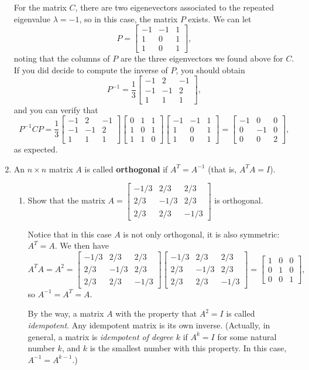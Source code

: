 \documentclass[12pt]{article}
\newcommand{\bbm}{\begin{bmatrix}}
\newcommand{\ebm}{\end{bmatrix}}
\begin{document}
\begin{enumerate}
For the matrix $C$, there are two eigenevectors associated to the repeated eigenvalue $\lambda = -1$, so in this case, the matrix $P$ exists. We can let
\[
 P = \bbm -1&-1&1\\1&0&1\\1&0&1\ebm,
\]
noting that the columns of $P$ are the three eigenvectors we found above for $C$. If you did decide to compute the inverse of $P$, you should obtain
\[
 P^{-1} = \frac{1}{3}\bbm -1&2&-1\\-1&-1&2\\1&1&1\ebm,
\]
and you can verify that
\[
 P^{-1}CP = \frac{1}{3}\bbm -1&2&-1\\-1&-1&2\\1&1&1\ebm\bbm 0&1&1\\1&0&1\\1&1&0\ebm\bbm -1&-1&1\\1&0&1\\1&0&1\ebm = \bbm -1&0&0\\0&-1&0\\0&0&2\ebm,
\]
as expected.

\item An $n\times n$ matrix $A$ is called \textbf{orthogonal} if $A^T=A^{-1}$ (that is, $A^TA=I$).
\begin{enumerate}
 \item Show that the matrix $A=\bbm -1/3&2/3&2/3\\2/3&-1/3&2/3\\2/3&2/3&-1/3\ebm$ is orthogonal. 

\bigskip

Notice that in this case $A$ is not only orthogonal, it is also symmetric: $A^T=A$. We then have
\[
 A^TA = A^2 = \bbm -1/3&2/3&2/3\\2/3&-1/3&2/3\\2/3&2/3&-1/3\ebm\bbm -1/3&2/3&2/3\\2/3&-1/3&2/3\\2/3&2/3&-1/3\ebm=\bbm 1&0&0\\0&1&0\\0&0&1\ebm,
\]
so $A^{-1} = A^T = A$. 

By the way, a matrix $A$ with the property that $A^2 = I$ is called \textit{idempotent}. Any idempotent matrix is its own inverse. (Actually, in general, a matrix is \textit{idempotent of degree $k$} if $A^k=I$ for some natural number $k$, and $k$ is the smallest number with this property. In this case, $A^{-1} = A^{k-1}$.)


\end{enumerate}
\end{enumerate}
\end{document}
